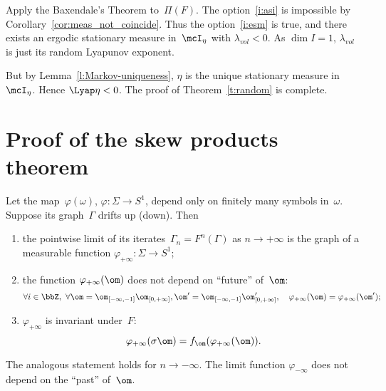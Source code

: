 \documentclass[a4paper,12pt]{amsart}
\begin{document}
Apply the Baxendale's Theorem to~$\Pi(F)$. The option~\ref{i:asi} is impossible by Corollary~\ref{cor:meas_not_coincide}.
Thus the option~\ref{i:esm} is true, and there exists an ergodic stationary measure in~$\mcI_\eta$ with $\lambda_{vol} < 0$. As $\dim I = 1$, $\lambda_{vol}$ is just its random Lyapunov exponent.

But by Lemma~\ref{l:Markov-uniqueness}, $\eta$ is the unique stationary measure in~$\mcI_\eta$. Hence $\Lyap\eta < 0$. The proof of Theorem~\ref{t:random} is complete.

\section{Proof of the skew products theorem}   \label{s:proof_markov_classif}


\begin{Prop}    \label{p:limit_step}
Let the map~$\varphi(\omega)$, $\varphi \colon \Sigma \to S^1$, depend only on finitely many symbols in~$\omega$. Suppose its graph~$\Gamma$ drifts up (down). Then
\begin{enumerate}
\item the pointwise limit of its iterates~$\Gamma_n = F^n(\Gamma)$ as $n \to +\infty$ is the graph of a measurable function $\varphi_{+\infty} \colon \Sigma \to S^1$;
\item the function $\varphi_{+\infty}(\om)$ does not depend on ``future'' of~$\om$:
$$
\forall i \in \bbZ, \ \forall \om = \om_{[-\infty, -1]} \om_{[0, +\infty]}, \om' = \om_{[-\infty, -1]} \om_{[0, +\infty]}', \quad \varphi_{+\infty} (\om) = \varphi_{+\infty} (\om');
$$
\item $\varphi_{+\infty}$ is invariant under~$F$:
$$
\varphi_{+\infty} (\sigma \om) = f_{\om} (\varphi_{+\infty} (\om)).
$$
\end{enumerate}
\end{Prop}

\begin{Rem}
The analogous statement holds for $n \to -\infty$. The limit function $\varphi_{-\infty}$ does not depend on the ``past'' of~$\om$.
\end{Rem}
\end{document}
